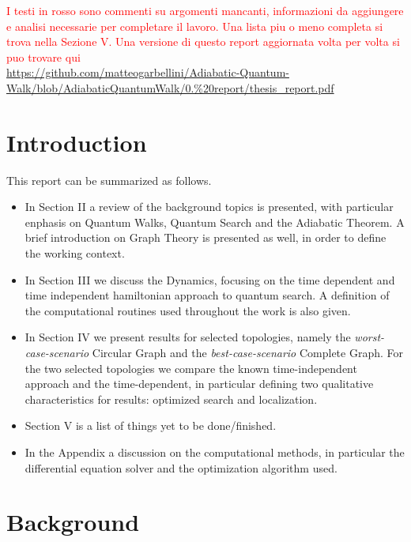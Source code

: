 \documentclass[aps,pra,reprint, onecolumn]{revtex4-2}
\newcommand{\red}[1]{\textcolor{red}{#1}}
\begin{document}

\red{I testi in rosso sono commenti su argomenti mancanti, informazioni da aggiungere e analisi necessarie per completare il lavoro. Una lista piu o meno completa si trova nella Sezione V. Una versione di questo report aggiornata volta per volta si puo trovare qui}\\ {\footnotesize \url{https://github.com/matteogarbellini/Adiabatic-Quantum-Walk/blob/AdiabaticQuantumWalk/0.%20report/thesis_report.pdf}}

\section{Introduction}
This report can be summarized as follows.
\begin{itemize}
\item In Section II a review of the background topics is presented, with particular enphasis on Quantum Walks, Quantum Search and the Adiabatic Theorem. A brief introduction on Graph Theory is presented as well, in order to define the working context.
\item In Section III we discuss the Dynamics, focusing on the time dependent and time independent hamiltonian approach to quantum search. A definition of the computational routines used throughout the work is also given.
\item In Section IV we present results for selected topologies, namely the \textit{worst-case-scenario} Circular Graph and the \textit{best-case-scenario} Complete Graph. For the two selected topologies we compare the known time-independent approach and the time-dependent, in particular defining two qualitative characteristics for results: optimized search and localization.
\item Section V is a list of things yet to be done/finished.
\item In the Appendix a discussion on the computational methods, in particular the differential equation solver and the optimization algorithm used. 
\end{itemize}

\section{Background}
\end{document}
